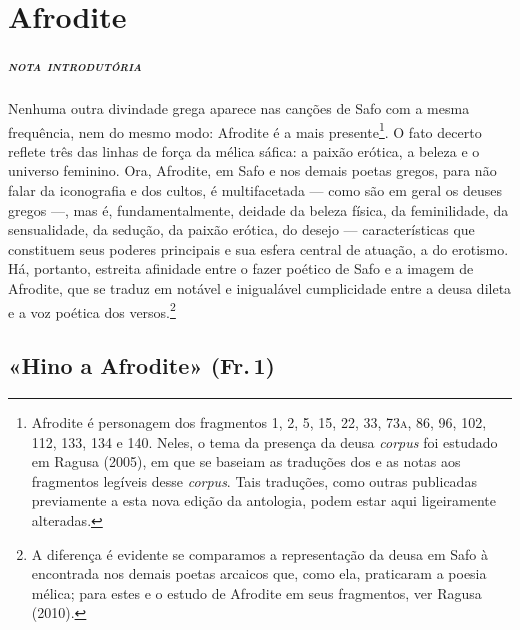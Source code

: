 \setbeforesecskip{1.2\onelineskip}%
  \setaftersecskip{.35\onelineskip}%
  \setsecheadstyle{\large\baselineskip=.7\baselineskip\bfseries\scshape\MakeTextLowercase}%

\oneside
\pagestyle{plain}



\chapter{Afrodite}

\paragraph{\textsc{nota introdutória}} 
Nenhuma outra divindade grega aparece nas canções de Safo com a mesma
frequência, nem do mesmo modo: Afrodite é a mais presente\footnote{ Afrodite é
personagem dos fragmentos 1, 2, 5, 15, 22, 33, 73\textsc{a}, 86, 96, 102, 112, 133, 134
e 140. Neles, o tema da presença da deusa \textit{corpus} foi estudado em Ragusa (2005), em que se baseiam as traduções dos e as notas aos fragmentos legíveis desse \textit{corpus}. Tais traduções, como outras publicadas previamente a esta nova edição da antologia, podem estar aqui ligeiramente alteradas.}. O fato
decerto reflete três das linhas de força da mélica sáfica: a
paixão erótica, a beleza e o universo feminino. Ora, Afrodite, em Safo e nos
demais poetas gregos, para não falar da iconografia e dos cultos, é
multifacetada --- como são em geral os deuses gregos ---, mas é, fundamentalmente,
deidade da beleza física, da feminilidade, da sensualidade, da sedução, da
paixão erótica, do desejo --- características que constituem seus poderes
principais e sua esfera central de atuação, a do erotismo. Há, portanto,
estreita afinidade entre o fazer poético de Safo e a imagem de Afrodite, que se
traduz em notável e inigualável cumplicidade entre a deusa dileta e a voz
poética dos versos.\footnote{ A diferença é evidente se comparamos a
representação da deusa em Safo à encontrada nos demais poetas arcaicos que, como ela, praticaram a poesia mélica; para estes e o estudo de Afrodite em seus fragmentos, ver Ragusa (2010).}

\pagebreak
\section{«Hino a Afrodite» (Fr.\,1)} 

